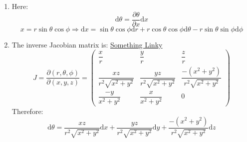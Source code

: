 \documentclass[12pt,a4]{article}
\newcommand{\e}{\mathrm{d}}
\begin{document}
\begin{enumerate}
\begin{align*}
    \end{align*}
    Now $\sqrt{g} = r^2 \sin \theta$ and $g^{\theta \theta} = -\frac{1}{r^2}$ and $g^{\phi\phi} = -\frac{1}{r^2 \sin^2\theta }$
    Therefore $\tensor{\epsilon}{^\theta ^\phi_t_r} = \sqrt{g} g^{\theta\theta} g^{\phi\phi} \sigma_{\theta\phi t r}$ and:
    \begin{align*}
      \e * F^{(4)} &= \e \left(Q \frac{Q}{r^2} \e t \wedge \e r\right)\\
                   &= 0 
    \end{align*}
  \item
    Here:
    \begin{equation*}
      \e \theta = \frac{\partial \theta }{ \partial x} \e x
    \end{equation*}
    \begin{equation*}
      x =  r \sin \theta \cos \phi \Rightarrow \e x = \sin \theta \cos \phi \e r + r \cos \theta \cos \phi \e \theta -  r \sin \theta \sin \phi \e \phi
    \end{equation*}
  \item
    The inverse Jacobian matrix is:
    \href{https://en.wikipedia.org/wiki/Spherical_coordinate_system}{Something Linky}
    \begin{equation*}
      J = \frac{\partial(r, \theta, \phi)}{\partial (x, y, z)} =
      \left(
      \begin{matrix}
        \dfrac{x}{r}&\dfrac{y}{r}&\dfrac{z}{r}\\
        \dfrac{xz}{r^2\sqrt{x^2+y^2}}&\dfrac{yz}{r^2\sqrt{x^2+y^2}}&\dfrac{-\left(x^2 + y^2\right)}{r^2\sqrt{x^2+y^2}}\\
        \dfrac{-y}{x^2+y^2}&\dfrac{x}{x^2+y^2}&0
      \end{matrix}
      \right)
    \end{equation*}
    Therefore:
    \begin{equation*}
      \e \theta = \dfrac{xz}{r^2\sqrt{x^2+y^2}} \e x + \dfrac{yz}{r^2\sqrt{x^2+y^2}} \e y + \dfrac{-\left(x^2 + y^2\right)}{r^2\sqrt{x^2+y^2}} \e z

\end{equation*}
\end{enumerate}
\end{document}
